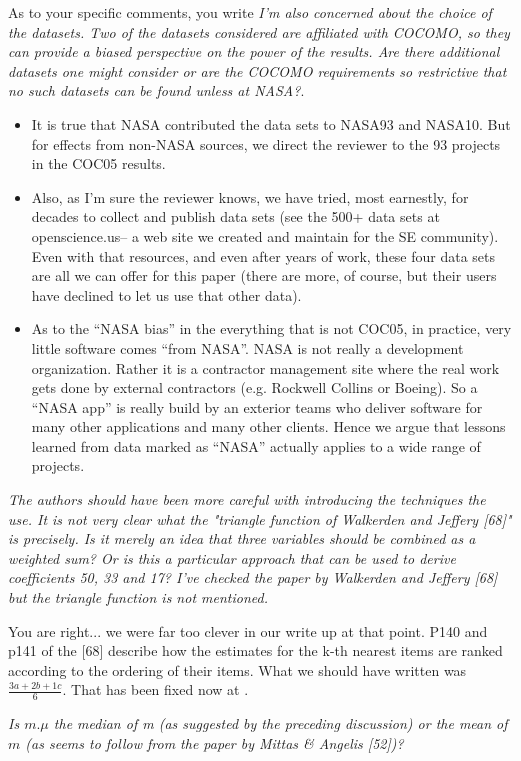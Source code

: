 \documentclass[smallcondesed]{svjour3}
\newcommand{\bi}{\begin{itemize}[leftmargin=0.4cm]}
\newcommand{\ei}{\end{itemize}}
\begin{document}
As to your specific comments, you write {\em I'm
  also concerned about the choice of the
  datasets. Two of the datasets considered are
  affiliated with COCOMO, so they can provide a
  biased perspective on the power of the
  results. Are there additional datasets one might
  consider or are the COCOMO requirements so
  restrictive that no such datasets can be found
  unless at NASA?}. 
\bi
\item
  It is true that NASA contributed the data sets to NASA93 and NASA10.
  But for effects from non-NASA sources, we direct the reviewer to the 93 projects
  in the COC05
  results. 
\item
  Also, as I'm sure the reviewer knows,
  we have tried, most earnestly, for decades to collect
and publish  data sets (see the 
500+ data sets at openscience.us-- a web site we created and maintain for the SE community).
Even with that resources, and even after years of work,
these four data sets are all we can offer for this paper
(there are more, of course, but their users have declined
to let us use that other data).
\item
  As to the ``NASA bias'' in the everything that is not COC05,
  in practice, very little software comes
``from NASA''. NASA is not
really a development organization. Rather it is a contractor
management site where the real work gets done by external
contractors (e.g. Rockwell Collins or Boeing). So a ``NASA app''
is really build by an exterior teams who deliver software
for many other applications and many other clients. Hence we argue
that lessons learned from data
marked as ``NASA'' actually applies
to a wide range of projects.
  \ei
     {\em The authors should have been more careful with introducing the techniques the use. It is not very clear what the "triangle function of Walkerden and Jeffery [68]" is precisely. Is it merely an idea that three variables should be combined as a weighted sum? Or is this a particular approach that can be used to derive coefficients 50, 33 and 17? I've checked the paper by Walkerden and Jeffery [68] but the triangle function is not mentioned.}

     You are right... we were far too clever in our write up at that
     point.
     P140 and p141 of the [68] describe how the estimates for the k-th
     nearest items are ranked according to the ordering of their items.
     What we should have written was $\frac{3a + 2b + 1c}{6}$. That has been fixed now at  .

     {\em     Is $m.\mu$ the median of m (as suggested by the preceding discussion) or the mean of $m$ (as seems to follow from the paper by Mittas \& Angelis [52])?}
\end{document}

